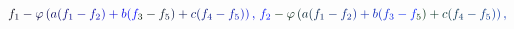 \documentclass[12pt]{article}
\begin{document}
\makeatletter
\renewcommand*{\@textcolor}[3]{%
  \protect\leavevmode
  \begingroup
    \color#1{#2}#3%
  \endgroup
}
\makeatother
\begin{displaymath}
\mathcolor[RGB]{0,0,15}{f} _ { \mathcolor[RGB]{0,0,30}{1} } \mathcolor[RGB]{0,0,45}{-} \mathcolor[RGB]{0,0,60}{\varphi} \mathcolor[RGB]{0,0,75}{\left(} \mathcolor[RGB]{0,0,90}{a} \mathcolor[RGB]{0,0,105}{(} \mathcolor[RGB]{0,0,120}{f} _ { \mathcolor[RGB]{0,0,135}{1} } \mathcolor[RGB]{0,0,150}{-} \mathcolor[RGB]{0,0,165}{f} _ { \mathcolor[RGB]{0,0,180}{2} } \mathcolor[RGB]{0,0,195}{)} \mathcolor[RGB]{0,0,210}{+} \mathcolor[RGB]{0,0,225}{b} \mathcolor[RGB]{0,0,240}{(} \mathcolor[RGB]{0,0,255}{f} _ { \mathcolor[RGB]{0,15,0}{3} } \mathcolor[RGB]{0,15,15}{-} \mathcolor[RGB]{0,15,30}{f} _ { \mathcolor[RGB]{0,15,45}{5} } \mathcolor[RGB]{0,15,60}{)} \mathcolor[RGB]{0,15,75}{+} \mathcolor[RGB]{0,15,90}{c} \mathcolor[RGB]{0,15,105}{(} \mathcolor[RGB]{0,15,120}{f} _ { \mathcolor[RGB]{0,15,135}{4} } \mathcolor[RGB]{0,15,150}{-} \mathcolor[RGB]{0,15,165}{f} _ { \mathcolor[RGB]{0,15,180}{5} } \mathcolor[RGB]{0,15,195}{)} \mathcolor[RGB]{0,15,210}{\right)} \mathcolor[RGB]{0,15,225}{,} \mathcolor[RGB]{0,15,240}{\,
f} _ { \mathcolor[RGB]{0,15,255}{2} } \mathcolor[RGB]{0,30,0}{-} \mathcolor[RGB]{0,30,15}{\varphi} \mathcolor[RGB]{0,30,30}{\left(} \mathcolor[RGB]{0,30,45}{a} \mathcolor[RGB]{0,30,60}{(} \mathcolor[RGB]{0,30,75}{f} _ { \mathcolor[RGB]{0,30,90}{1} } \mathcolor[RGB]{0,30,105}{-} \mathcolor[RGB]{0,30,120}{f} _ { \mathcolor[RGB]{0,30,135}{2} } \mathcolor[RGB]{0,30,150}{)} \mathcolor[RGB]{0,30,165}{+} \mathcolor[RGB]{0,30,180}{b} \mathcolor[RGB]{0,30,195}{(} \mathcolor[RGB]{0,30,210}{f} _ { \mathcolor[RGB]{0,30,225}{3} } \mathcolor[RGB]{0,30,240}{-} \mathcolor[RGB]{0,30,255}{f} _ { \mathcolor[RGB]{0,45,0}{5} } \mathcolor[RGB]{0,45,15}{)} \mathcolor[RGB]{0,45,30}{+} \mathcolor[RGB]{0,45,45}{c} \mathcolor[RGB]{0,45,60}{(} \mathcolor[RGB]{0,45,75}{f} _ { \mathcolor[RGB]{0,45,90}{4} } \mathcolor[RGB]{0,45,105}{-} \mathcolor[RGB]{0,45,120}{f} _ { \mathcolor[RGB]{0,45,135}{5} } \mathcolor[RGB]{0,45,150}{)} \mathcolor[RGB]{0,45,165}{\right)} \mathcolor[RGB]{0,45,180}{,} \mathcolor[RGB]{0,45,195}{\,
}
\end{displaymath}
\end{document}
